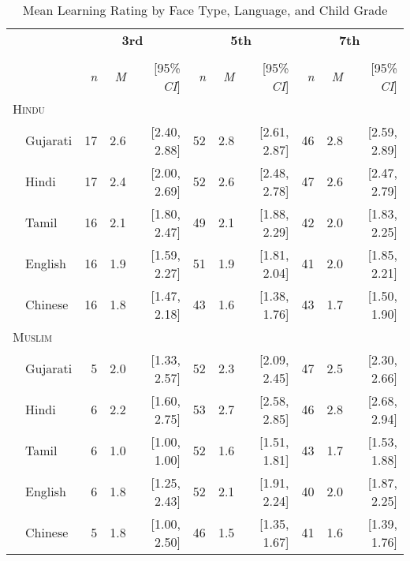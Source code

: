 \begin{table}[H]
\centering
\caption{Mean Learning Rating by Face Type, Language, and Child Grade}\\
\begin{footnotesize}
\label{tab:face-learning-means}
\begin{tabular}{p{.1in}lrrrrrrrrr}
\toprule
 &  & \multicolumn{3}{c}{\textbf{3rd}} & \multicolumn{3}{c}{\textbf{5th}} & \multicolumn{3}{c}{\textbf{7th}} \\
\cline{3-5} \cline{6-8} \cline{9-11}\\[-.75em]
&  & \textit{n} & \textit{M} & [95\% \textit{CI}] &  \textit{n} & \textit{M} & [95\% \textit{CI}] &  \textit{n}  & \textit{M} & [95\% \textit{CI}]\\
\midrule
\multicolumn{11}{l}{\textsc{Hindu}}\\
 & Gujarati & 17 & 2.6 & [2.40, 2.88] & 52 & 2.8 & [2.61, 2.87] & 46 & 2.8 & [2.59, 2.89]\\

 & Hindi & 17 & 2.4 & [2.00, 2.69] & 52 & 2.6 & [2.48, 2.78] & 47 & 2.6 & [2.47, 2.79]\\

& Tamil & 16 & 2.1 & [1.80, 2.47] & 49 & 2.1 & [1.88, 2.29] & 42 & 2.0 & [1.83, 2.25]\\

 & English & 16 & 1.9 & [1.59, 2.27] & 51 & 1.9 & [1.81, 2.04] & 41 & 2.0 & [1.85, 2.21]\\

& Chinese & 16 & 1.8 & [1.47, 2.18] & 43 & 1.6 & [1.38, 1.76] & 43 & 1.7 & [1.50, 1.90]\\

\midrule
\multicolumn{11}{l}{\textsc{Muslim}}\\
& Gujarati & 5 & 2.0 & [1.33, 2.57] & 52 & 2.3 & [2.09, 2.45] & 47 & 2.5 & [2.30, 2.66]\\

 & Hindi & 6 & 2.2 & [1.60, 2.75] & 53 & 2.7 & [2.58, 2.85] & 46 & 2.8 & [2.68, 2.94]\\

& Tamil & 6 & 1.0 & [1.00, 1.00] & 52 & 1.6 & [1.51, 1.81] & 43 & 1.7 & [1.53, 1.88]\\

 & English & 6 & 1.8 & [1.25, 2.43] & 52 & 2.1 & [1.91, 2.24] & 40 & 2.0 & [1.87, 2.25]\\
 & Chinese & 5 & 1.8 & [1.00, 2.50] & 46 & 1.5 & [1.35, 1.67] & 41 & 1.6 & [1.39, 1.76]\\


\end{tabular}
\end{footnotesize}
\end{table}
